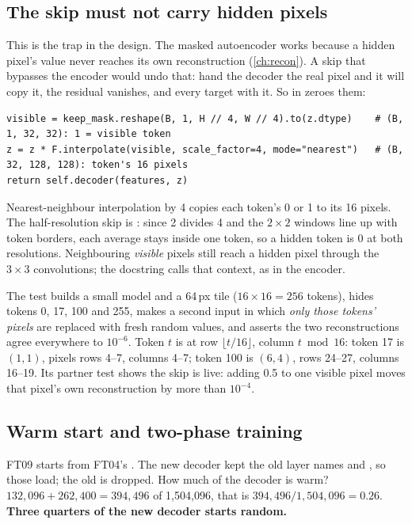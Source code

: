 \subsection{The skip must not carry hidden pixels}

This is the trap in the design. The masked autoencoder works because a hidden pixel's value never reaches its
own reconstruction (\cref{ch:recon}). A skip that bypasses the encoder would undo that: hand the decoder the real
pixel and it will copy it, the residual vanishes, and every target with it. So  in
 zeroes them:
\begin{lstlisting}
visible = keep_mask.reshape(B, 1, H // 4, W // 4).to(z.dtype)    # (B, 1, 32, 32): 1 = visible token
z = z * F.interpolate(visible, scale_factor=4, mode="nearest")   # (B, 32, 128, 128): token's 16 pixels
return self.decoder(features, z)
\end{lstlisting}
Nearest-neighbour interpolation by 4 copies each token's 0 or 1 to its 16 pixels. The half-resolution skip is
: since 2 divides 4 and the $2\times2$ windows line up with token borders, each average
stays inside one token, so a hidden token is 0 at both resolutions. Neighbouring \emph{visible} pixels still reach
a hidden pixel through the $3\times3$ convolutions; the docstring calls that context, as in the encoder.

The test  builds a small model and a 64\,px tile ($16\times16=256$
tokens), hides tokens 0, 17, 100 and 255, makes a second input in which \emph{only those tokens' pixels} are
replaced with fresh random values, and asserts the two reconstructions agree everywhere to $10^{-6}$. Token $t$
is at row $\lfloor t/16\rfloor$, column $t \bmod 16$: token 17 is $(1,1)$, pixels rows 4--7, columns 4--7; token
100 is $(6,4)$, rows 24--27, columns 16--19. Its partner test shows the skip is live: adding 0.5 to one visible
pixel moves that pixel's own reconstruction by more than $10^{-4}$.

\subsection{Warm start and two-phase training}

FT09 starts from FT04's . The new decoder kept the old layer names  and
, so those load; the old  is dropped. How much of the decoder is warm?
$132{,}096+262{,}400=394{,}496$ of 1,504,096, that is $394{,}496/1{,}504{,}096=0.26$. \textbf{Three quarters of the
new decoder starts random.}

